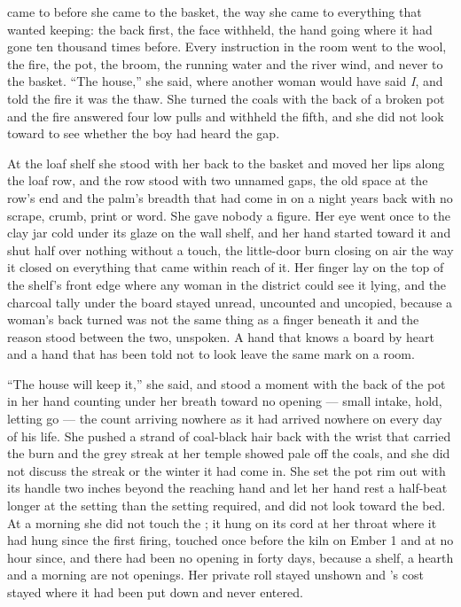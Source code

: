 \scenebreak

 came to  before she came to the basket, the way she came to everything that wanted keeping: the back first, the face withheld, the hand going where it had gone ten thousand times before. Every instruction in the room went to the wool, the fire, the pot, the broom, the running water and the river wind, and never to the basket. “The house,” she said, where another woman would have said \emph{I}, and told the fire it was the thaw. She turned the coals with the back of a broken pot and the fire answered four low pulls and withheld the fifth, and she did not look toward  to see whether the boy had heard the gap.

At the loaf shelf she stood with her back to the basket and moved her lips along the loaf row, and the row stood with two unnamed gaps, the old space at the row's end and the palm's breadth that had come in on a night years back with no scrape, crumb, print or word. She gave nobody a figure. Her eye went once to the clay jar cold under its glaze on the wall shelf, and her hand started toward it and shut half over nothing without a touch, the little-door burn closing on air the way it closed on everything that came within reach of it. Her finger lay on the top of the shelf's front edge where any woman in the district could see it lying, and the charcoal tally under the board stayed unread, uncounted and uncopied, because a woman's back turned was not the same thing as a finger beneath it and the reason stood between the two, unspoken. A hand that knows a board by heart and a hand that has been told not to look leave the same mark on a room.

“The house will keep it,” she said, and stood a moment with the back of the pot in her hand counting under her breath toward no opening --- small intake, hold, letting go --- the count arriving nowhere as it had arrived nowhere on every day of his life. She pushed a strand of coal-black hair back with the wrist that carried the burn and the grey streak at her temple showed pale off the coals, and she did not discuss the streak or the winter it had come in. She set the pot rim out with its handle two inches beyond the reaching hand and let her hand rest a half-beat longer at the setting than the setting required, and did not look toward the bed. At a morning she did not touch the ; it hung on its cord at her throat where it had hung since the first firing, touched once before the kiln on Ember 1 and at no hour since, and there had been no opening in forty days, because a shelf, a hearth and a morning are not openings. Her private roll stayed unshown and 's cost stayed where it had been put down and never entered.

